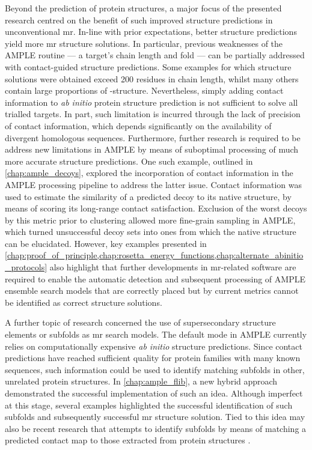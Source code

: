 Beyond the prediction of protein structures, a major focus of the presented research centred on the benefit of such improved structure predictions in unconventional \gls{mr}. In-line with prior expectations, better structure predictions yield more \gls{mr} structure solutions. In particular, previous weaknesses of the AMPLE routine --- a target's chain length and fold --- can be partially addressed with contact-guided structure predictions. Some examples for which structure solutions were obtained exceed 200 residues in chain length, whilst many others contain large proportions of \textbeta-structure. Nevertheless, simply adding contact information to \textit{ab initio} protein structure prediction is not sufficient to solve all trialled targets. In part, such limitation is incurred through the lack of precision of contact information, which depends significantly on the availability of divergent homologous sequences. Furthermore, further research is required to be address new limitations in AMPLE by means of suboptimal processing of much more accurate structure predictions. One such example, outlined in \cref{chap:ample_decoys}, explored the incorporation of contact information in the AMPLE processing pipeline to address the latter issue. Contact information was used to estimate the similarity of a predicted decoy to its native structure, by means of scoring its long-range contact satisfaction. Exclusion of the worst decoys by this metric prior to clustering allowed more fine-grain sampling in AMPLE, which turned unsuccessful decoy sets into ones from which the native structure can be elucidated. However, key examples presented in \cref{chap:proof_of_principle,chap:rosetta_energy_functions,chap:alternate_abinitio_protocols} also highlight that further developments in \gls{mr}-related software are required to enable the automatic detection and subsequent processing of AMPLE ensemble search models that are correctly placed but by current metrics cannot be identified as correct structure solutions.

A further topic of research concerned the use of supersecondary structure elements or subfolds as \gls{mr} search models. The default mode in AMPLE currently relies on computationally expensive \textit{ab initio} structure predictions. Since contact predictions have reached sufficient quality for protein families with many known sequences, such information could be used to identify matching subfolds in other, unrelated protein structures. In \cref{chap:ample_flib}, a new hybrid approach demonstrated the successful implementation of such an idea. Although imperfect at this stage, several examples highlighted the successful identification of such subfolds and subsequently successful \gls{mr} structure solution. Tied to this idea may also be recent research that attempts to identify subfolds by means of matching a predicted contact map to those extracted from protein structures \cite{Buchan2017-ox,Ovchinnikov2017-nd}. 

